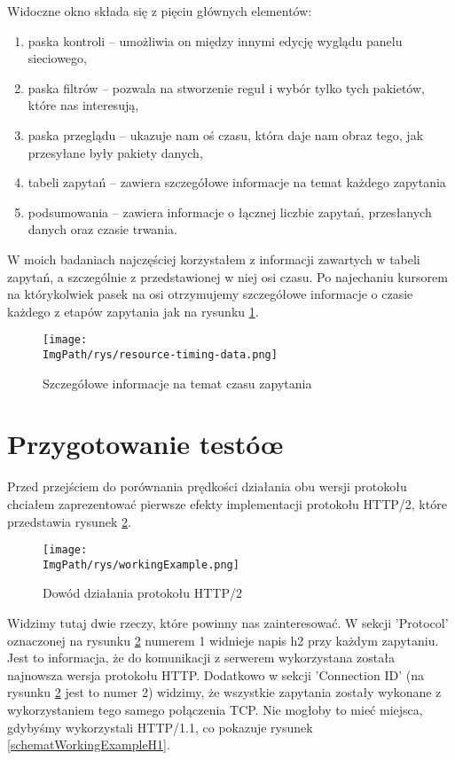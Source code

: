 \documentclass[a4paper,12pt,twoside,openany]{report}
\newcommand{\ImgPath}{.}
\begin{document}
Widoczne okno składa się z pięciu głównych elementów:
\begin{enumerate}
	\item paska kontroli -- umożliwia on między innymi edycję wyglądu panelu sieciowego,
	\item paska filtrów -- pozwala na stworzenie reguł i wybór tylko tych pakietów, które nas interesują,
	\item paska przeglądu -- ukazuje nam oś czasu, która daje nam obraz tego, jak przesyłane były pakiety danych,
	\item tabeli zapytań -- zawiera szczegółowe informacje na temat każdego zapytania
	\item podsumowania -- zawiera informacje o łącznej liczbie zapytań, przesłanych danych oraz czasie trwania.
\end{enumerate}

W moich badaniach najczęściej korzystałem z informacji zawartych w tabeli zapytań, a szczególnie z przedstawionej w niej osi czasu.
Po najechaniu kursorem na którykolwiek pasek na osi otrzymujemy szczegółowe informacje o czasie każdego z etapów zapytania jak na rysunku \ref{schematResourceTiming}.

\begin{figure}[!htbp]
	\begin{center}
\centering
\texttt{[image: \\ImgPath/rys/resource-timing-data.png]}
\end{center}
	\caption{Szczegółowe informacje na temat czasu zapytania}
	\label{schematResourceTiming}
\end{figure}

\section{Przygotowanie testóœ}

Przed przejściem do porównania prędkości działania obu wersji protokołu chciałem zaprezentować pierwsze efekty implementacji protokołu HTTP/2, które przedstawia rysunek \ref{schematWorkingExample}.

\begin{figure}[!htbp]
	\begin{center}
\centering
\texttt{[image: \\ImgPath/rys/workingExample.png]}
\end{center}
	\caption{Dowód działania protokołu HTTP/2}
	\label{schematWorkingExample}
\end{figure}

Widzimy tutaj dwie rzeczy, które powinny nas zainteresować. W sekcji 'Protocol' oznaczonej na rysunku \ref{schematWorkingExample} numerem 1 widnieje napis h2 przy każdym zapytaniu.
Jest to informacja, że do komunikacji z serwerem wykorzystana została najnowsza wersja protokołu HTTP.
Dodatkowo w sekcji 'Connection ID' (na rysunku \ref{schematWorkingExample} jest to numer 2) widzimy, że wszystkie zapytania zostały wykonane z wykorzystaniem tego samego połączenia TCP.
Nie mogłoby to mieć miejsca, gdybyśmy wykorzystali HTTP/1.1, co pokazuje rysunek \ref{schematWorkingExampleH1}.
\end{document}
